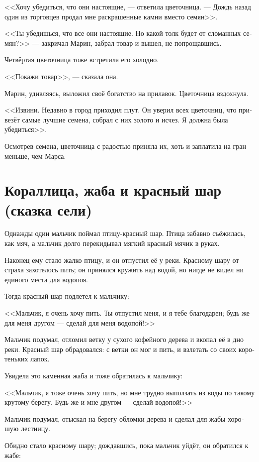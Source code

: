 \documentclass[a4paper,12pt,fleqn]{book}\usepackage{cooltooltips}\usepackage{polyglossia}\setdefaultlanguage[babelshorthands=true]{russian}\setotherlanguage{english}\defaultfontfeatures{Ligatures=TeX,Mapping=tex-text} \usepackage{xcolor}\definecolor{lightgray}{HTML}{bbbbbb}\color{lightgray}\newcommand{\ml}[3]{\textenglish{\textcolor{black}{#3}}}
\begin{document}
{<<Хочу убедиться, что они настоящие, --- ответила цветочница.
--- Дождь назад один из торговцев продал мне раскрашенные камни вместо семян>>.

<<Ты убедишься, что все они настоящие.
Но какой толк будет от сломанных семян?>> --- закричал Марин, забрал товар и вышел, не попрощавшись.

Четвёртая цветочница тоже встретила его холодно.

<<Покажи товар>>, --- сказала она.

Марин, удивляясь, выложил своё богатство на прилавок.
Цветочница вздохнула.

<<Извини.
Недавно в город приходил плут.
Он уверил всех цветочниц, что привезёт самые лучшие семена, собрал с них золото и исчез.
Я должна была убедиться>>.

Осмотрев семена, цветочница с радостью приняла их, хоть и заплатила на гран меньше, чем Марса.

\section{Кораллица, жаба и красный шар (сказка сели)}

Однажды один мальчик поймал птицу-красный шар.
Птица забавно съёжилась, как мяч, а мальчик долго перекидывал мягкий красный мячик в руках.

Наконец ему стало жалко птицу, и он отпустил её у реки.
Красному шару от страха захотелось пить;
он принялся кружить над водой, но нигде не видел ни единого места для водопоя.

Тогда красный шар подлетел к мальчику:

<<Мальчик, я очень хочу пить.
Ты отпустил меня, и я тебе благодарен;
будь же для меня другом --- сделай для меня водопой!>>

Мальчик подумал, отломил ветку у сухого кофейного дерева и вкопал её в дно реки.
Красный шар обрадовался: с ветки он мог и пить, и взлетать со своих коротеньких лапок.

Увидела это каменная жаба и тоже обратилась к мальчику:

<<Мальчик, я тоже очень хочу пить, но мне трудно выползать из воды по такому крутому берегу.
Будь же и мне другом --- сделай водопой!>>

Мальчик подумал, отыскал на берегу обломки дерева и сделал для жабы хорошую лестницу.

Обидно стало красному шару;
дождавшись, пока мальчик уйдёт, он обратился к жабе:

}
\end{document}
